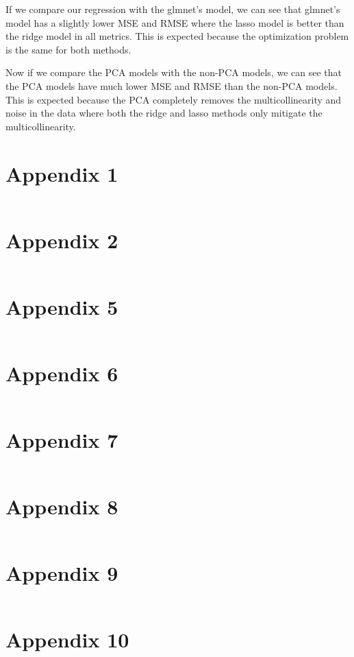 \documentclass{article}
\begin{document}
If we compare our regression with the glmnet's model, we can see that glmnet's model has a slightly lower MSE and RMSE where the lasso model is better than the ridge model in all metrics. This is expected because the optimization problem is the same for both methods.  \cite{Tay2023}

Now if we compare the PCA models with the non-PCA models, we can see that the PCA models have much lower MSE and RMSE than the non-PCA models. This is expected because the PCA completely removes the multicollinearity and noise in the data where both the ridge and lasso methods only mitigate the multicollinearity.




\newpage


\newpage
\section*{Appendix 1}
\inputminted{r}{q1.r}

\newpage
\section*{Appendix 2}
\inputminted{r}{q2.r}


\newpage
\section*{Appendix 5}
\inputminted{r}{q5.r}

\newpage
\section*{Appendix 6}
\inputminted{r}{q6.r}

\newpage
\section*{Appendix 7}
\inputminted{r}{q7.r}

\newpage
\section*{Appendix 8}
\inputminted{r}{q8.r}

\newpage
\section*{Appendix 9}
\inputminted{r}{q9.r}

\newpage
\section*{Appendix 10}
\inputminted{r}{q10.r}
\end{document}

